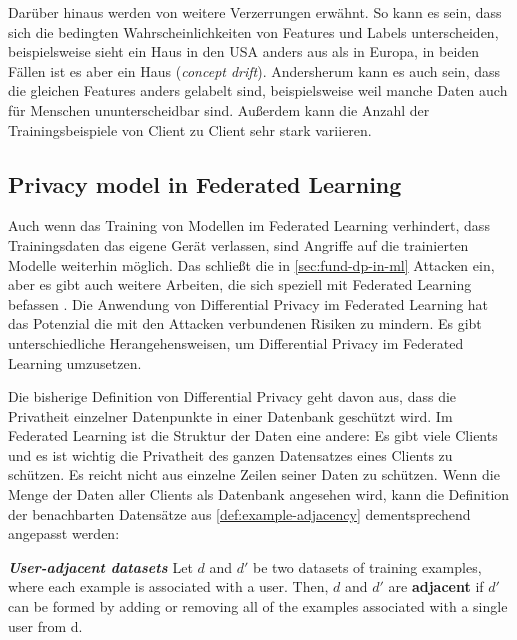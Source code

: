 Darüber hinaus werden von \textcite{kairouz:2021} weitere Verzerrungen erwähnt. So kann es sein, dass sich die bedingten Wahrscheinlichkeiten von Features und Labels unterscheiden, beispielsweise sieht ein Haus in den USA anders aus als in Europa, in beiden Fällen ist es aber ein Haus (\textit{concept drift}). Andersherum kann es auch sein, dass die gleichen Features anders gelabelt sind, beispielsweise weil manche Daten auch für Menschen ununterscheidbar sind. Außerdem kann die Anzahl der Trainingsbeispiele von Client zu Client sehr stark variieren. 

\subsection{Privacy model in Federated Learning}\label{sec:pm-in-fl}
Auch wenn das Training von Modellen im Federated Learning verhindert, dass Trainingsdaten das eigene Gerät verlassen, sind Angriffe auf die trainierten Modelle weiterhin möglich. Das schließt die in \autoref{sec:fund-dp-in-ml} Attacken ein, aber es gibt auch weitere Arbeiten, die sich speziell mit Federated Learning befassen \cite{geiping:2020, wang:2019}. Die Anwendung von Differential Privacy im Federated Learning hat das Potenzial die mit den Attacken verbundenen Risiken zu mindern. Es gibt unterschiedliche Herangehensweisen, um Differential Privacy im Federated Learning umzusetzen.

Die bisherige Definition von Differential Privacy geht davon aus, dass die Privatheit einzelner Datenpunkte in einer Datenbank geschützt wird. Im Federated Learning ist die Struktur der Daten eine andere: Es gibt viele Clients und es ist wichtig die Privatheit des ganzen Datensatzes eines Clients zu schützen. Es reicht nicht aus einzelne Zeilen seiner Daten zu schützen. Wenn die Menge der Daten aller Clients als Datenbank angesehen wird, kann die Definition der benachbarten Datensätze aus  \autoref{def:example-adjacency} dementsprechend angepasst werden:

\begin{definition}\label{def:user-adjacency}
	\emph{\textbf{User-adjacent datasets} \cite{mcmahan:2018}} Let $d$ and $d'$ be two datasets of training examples, where each example is associated with a user. Then, $d$ and $d'$ are \textbf{adjacent} if $d'$ can be formed by adding or removing all of the examples associated with a single user from d.
\end{definition}


